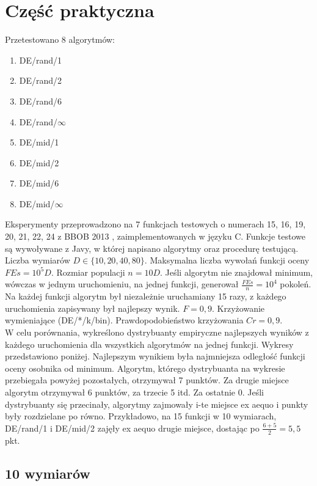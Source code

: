 \section{Część praktyczna}

Przetestowano 8 algorytmów:

\begin{enumerate}
 \item DE/rand/1
 \item DE/rand/2
 \item DE/rand/6
 \item DE/rand/$\infty$ 
 \item DE/mid/1 
 \item DE/mid/2
 \item DE/mid/6 
 \item DE/mid/$\infty$ 
\end{enumerate} 

Eksperymenty przeprowadzono na 7 funkcjach testowych o numerach 15, 16, 19, 20, 21, 22, 24 z BBOB 2013 \cite{finck}, zaimplementowanych w języku C.
Funkcje testowe są wywoływane z Javy, w której napisano algorytmy oraz procedurę testującą.
Liczba wymiarów $D \in \{10, 20, 40, 80\}$. Maksymalna liczba wywołań funkcji oceny $FEs = 10^5D$. Rozmiar populacji $n = 10D$. 
Jeśli algorytm nie znajdował minimum, wówczas w jednym uruchomieniu, na jednej funkcji, generował $\frac{FEs}{n} = 10^4$ pokoleń.
Na każdej funkcji algorytm był niezależnie uruchamiany 15 razy, z każdego uruchomienia zapisywany był najlepszy wynik.
$F = 0,9$. Krzyżowanie wymieniające (DE/*/k/bin).
Prawdopodobieństwo krzyżowania $Cr = 0,9$. \\

W celu porównania, wykreślono dystrybuanty empiryczne najlepszych wyników z każdego uruchomienia 
dla wszystkich algorytmów na jednej funkcji. Wykresy przedstawiono poniżej.
Najlepszym wynikiem była najmniejsza odległość funkcji oceny osobnika od minimum.
Algorytm, którego dystrybuanta na wykresie przebiegała powyżej pozostałych, otrzymywał 7 punktów. 
Za drugie miejsce algorytm otrzymywał 6 punktów, za trzecie 5 itd. Za ostatnie 0. 
Jeśli dystrybuanty się przecinały, algorytmy zajmowały i-te miejsce ex aequo i punkty były rozdzielane
po równo. 
Przykładowo, na 15 funkcji w 10 wymiarach, DE/rand/1 i DE/mid/2 zajęły ex aequo drugie miejsce,
dostając po $\frac{6+5}{2} = 5,5$ pkt.

\subsection{10 wymiarów}

